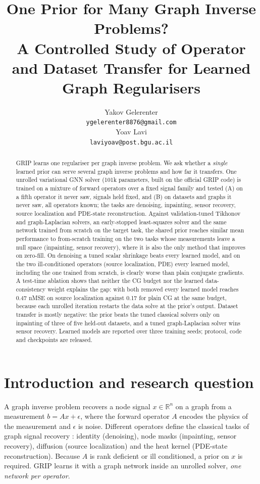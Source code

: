 \documentclass{article}
\title{One Prior for Many Graph Inverse Problems?\\
\large A Controlled Study of Operator and Dataset Transfer for Learned Graph Regularisers}
\author{%
  Yakov Gelerenter \\
  \texttt{ygelerenter8876@gmail.com} \\
  \And
  Yoav Lavi \\
  \texttt{laviyoav@post.bgu.ac.il} \\
}
\begin{document}
\maketitle

\begin{abstract}
GRIP learns one regulariser per graph inverse problem. We ask whether a \emph{single} learned prior can serve
several graph inverse problems and how far it transfers. One unrolled variational GNN solver (101k parameters,
built on the official GRIP code) is trained on a mixture of forward operators over a fixed signal family and
tested (A) on a fifth operator it never saw, signals held fixed, and (B) on datasets and graphs it never saw,
all operators known; the tasks are denoising, inpainting, sensor recovery, source localization and PDE-state
reconstruction. Against validation-tuned Tikhonov and graph-Laplacian solvers, an
early-stopped least-squares solver and the same network trained from scratch on the target task, the
shared prior reaches similar mean performance to from-scratch training on the two tasks whose measurements leave a null
space (inpainting, sensor recovery), where it is also the only method that improves on zero-fill. On denoising
a tuned scalar shrinkage beats every learned model, and on the two ill-conditioned operators (source
localization, PDE) every learned model, including the one trained from scratch, is clearly worse than plain
conjugate gradients. A test-time ablation shows that neither the CG budget nor the learned data-consistency
weight explains the gap: with both removed every learned model reaches 0.47 nMSE on source localization
against 0.17 for plain CG at the same budget, because each unrolled iteration restarts the data solve at the
prior's output. Dataset transfer is mostly negative: the prior beats the tuned classical solvers only on
inpainting of three of five held-out datasets, and a tuned graph-Laplacian solver wins sensor recovery. Learned models are reported over three training seeds; protocol, code and
checkpoints are released.
\end{abstract}

\section{Introduction and research question}
A graph inverse problem recovers a node signal $x \in \mathbb{R}^{n}$ on a graph from a measurement
$b = A x + \epsilon$, where the forward operator $A$ encodes the physics of the measurement and $\epsilon$ is
noise. Different operators define the classical tasks of graph signal recovery \citep{ortega2018gsp}: identity
(denoising), node masks (inpainting, sensor recovery), diffusion (source localization) and the heat kernel
(PDE-state reconstruction). Because $A$ is rank deficient or ill conditioned, a prior on $x$ is required. GRIP
\citep{eliasof2025grip} learns it with a graph network inside an unrolled solver, \emph{one network per operator}.
\end{document}
